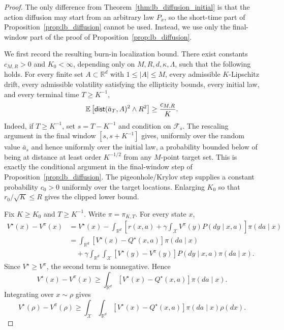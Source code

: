 \documentclass{article}
\newcommand{\1}{\mathbbm{1}}
\newcommand{\dist}{{\sf dist}}
\numberwithin{equation}{section}
\begin{document}
\begin{proof}
The only difference from Theorem~\ref{thm:lb_diffusion_initial} is that the
action diffusion may start from an arbitrary law \(P_x\), so the short-time
part of Proposition~\ref{prop:lb_diffusion} cannot be used. Instead, we use
only the final-window part of the proof of Proposition~\ref{prop:lb_diffusion}.

We first record the resulting burn-in localization bound. There exist
constants \(c_{M,R}>0\) and \(K_0<\infty\), depending only on
\(M,R,d,\kappa,\Lambda\), such that the following holds. For every finite set
\(A\subset\mathbb R^d\) with \(1\leq |A|\leq M\), every admissible
\(K\)-Lipschitz drift, every admissible volatility satisfying the ellipticity
bounds, every initial law, and every terminal time \(T\geq K^{-1}\),
\[
    \mathbb E\left[
        \dist(\bar a_T,A)^2\wedge R^2
    \right]
    \geq
    \frac{c_{M,R}}{K}.
\]
Indeed, if \(T\geq K^{-1}\), set \(s=T-K^{-1}\) and condition on
\(\mathcal F_s\). The rescaling argument in the final window
\([s,s+K^{-1}]\) gives, uniformly over the random value \(\bar a_s\) and
hence uniformly over the initial law, a probability bounded below of being at
distance at least order \(K^{-1/2}\) from any \(M\)-point target set. This is
exactly the conditional argument in the final-window step of
Proposition~\ref{prop:lb_diffusion}. The pigeonhole/Krylov step supplies a
constant probability \(c_0>0\) uniformly over the target locations. Enlarging
\(K_0\) so that \(r_0/\sqrt K\leq R\) gives the clipped lower bound.

Fix \(K\geq K_0\) and \(T\geq K^{-1}\). Write \(\pi=\pi_{K,T}\). For every
state \(x\),
\[
\begin{aligned}
V^\star(x)-V^\pi(x)
&=
V^\star(x)
-
\int_{\mathbb R^d}
\left[
r(x,a)+\gamma\int_{\mathcal X} V^\pi(y)P(dy\mid x,a)
\right]\pi(da\mid x) \\
&=
\int_{\mathbb R^d}
\left[
V^\star(x)-Q^\star(x,a)
\right]\pi(da\mid x) \\
&\quad+
\gamma
\int_{\mathbb R^d}
\int_{\mathcal X}
\left[
V^\star(y)-V^\pi(y)
\right]
P(dy\mid x,a)\pi(da\mid x).
\end{aligned}
\]
Since \(V^\star\geq V^\pi\), the second term is nonnegative. Hence
\[
V^\star(x)-V^\pi(x)
\geq
\int_{\mathbb R^d}
\left[
V^\star(x)-Q^\star(x,a)
\right]\pi(da\mid x).
\]
Integrating over \(x\sim\rho\) gives
\[
V^\star(\rho)-V^\pi(\rho)
\geq
\int_{\mathcal X}
\int_{\mathbb R^d}
\left[
V^\star(x)-Q^\star(x,a)
\right]\pi(da\mid x)\rho(dx).
\]


\end{proof}
\end{document}
